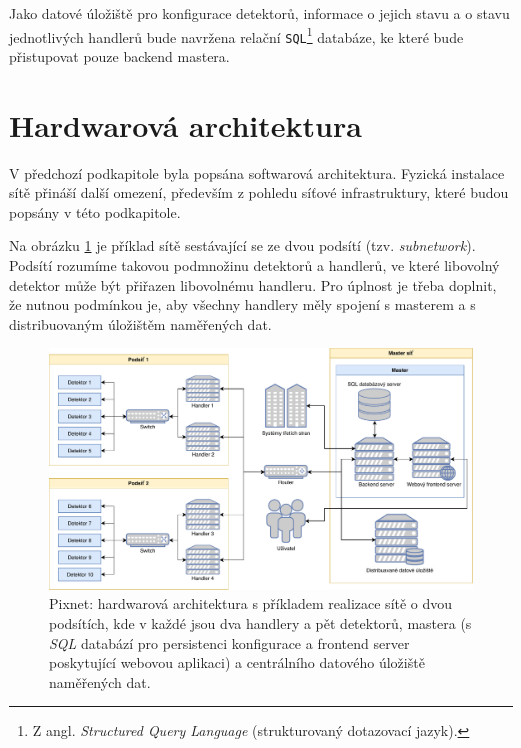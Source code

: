 Jako datové úložiště pro konfigurace detektorů, informace o jejich stavu a o stavu jednotlivých handlerů bude navržena relační \texttt{SQL}\footnote{Z angl. \textit{Structured Query Language} (strukturovaný dotazovací jazyk).} databáze, ke které bude přistupovat pouze backend mastera.

\section{Hardwarová architektura}\label{chap:arch:hw}
V předchozí podkapitole byla popsána softwarová architektura. Fyzická instalace sítě přináší další omezení, především z pohledu síťové infrastruktury, které budou popsány v této podkapitole.

Na obrázku \ref{fig:arch:hw_architecture} je příklad sítě sestávající se ze dvou podsítí (tzv. \textit{subnetwork}). Podsítí rozumíme takovou podmnožinu detektorů a handlerů, ve které libovolný detektor může být přiřazen libovolnému handleru. Pro úplnost je třeba doplnit, že nutnou podmínkou je, aby všechny handlery měly spojení s masterem a s distribuovaným úložištěm naměřených dat.

\begin{figure}[h]
	\begin{center}
		\includegraphics[width=15cm]{figures/arch_hw.pdf}
		\caption{Pixnet: hardwarová architektura s příkladem realizace sítě o dvou podsítích, kde v každé jsou dva handlery a pět detektorů, mastera (s \textit{SQL} databází pro persistenci konfigurace a frontend server poskytující webovou aplikaci) a centrálního datového úložiště naměřených dat.}
		\label{fig:arch:hw_architecture}
	\end{center}
\end{figure}

